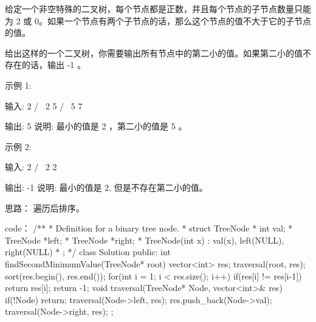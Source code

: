 给定一个非空特殊的二叉树，每个节点都是正数，并且每个节点的子节点数量只能为 2 或 0。如果一个节点有两个子节点的话，那么这个节点的值不大于它的子节点的值。 

给出这样的一个二叉树，你需要输出所有节点中的第二小的值。如果第二小的值不存在的话，输出 -1 。

示例 1:

输入: 
    2
   / \
  2   5
     / \
    5   7

输出: 5
说明: 最小的值是 2 ，第二小的值是 5 。

示例 2:

输入: 
    2
   / \
  2   2

输出: -1
说明: 最小的值是 2, 但是不存在第二小的值。
































思路：
遍历后排序。


























code：
/**
 * Definition for a binary tree node.
 * struct TreeNode {
 *     int val;
 *     TreeNode *left;
 *     TreeNode *right;
 *     TreeNode(int x) : val(x), left(NULL), right(NULL) {}
 * };
 */
class Solution {
public:
    int findSecondMinimumValue(TreeNode* root) {
        vector<int> res;
        traversal(root, res);
        sort(res.begin(), res.end());
        for(int i = 1; i < res.size(); i++)
        {
            if(res[i] != res[i-1])
                return res[i];
        }
        return -1;
    }
    void traversal(TreeNode* Node, vector<int>& res)
    {
        if(!Node) return;
        traversal(Node->left, res);
        res.push_back(Node->val);
        traversal(Node->right, res);
    }
};
